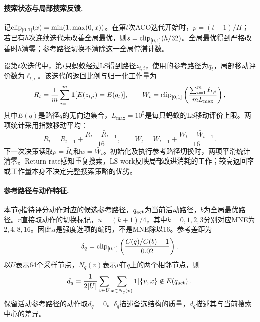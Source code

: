 \paragraph{搜索状态与局部搜索反馈.}
记$\operatorname{clip}_{[0,1]}(x)=\min(1,\max(0,x))$。在第$t$次ACO迭代开始时，$p=(t-1)/H$；若已有$h$次连续迭代未改善全局最优，则$s=\operatorname{clip}_{[0,1]}(h/32)$。全局最优得到严格改善时$h$清零；参考路径切换不清除这一全局停滞计数。

设第$t$次迭代中，第$i$只蚂蚁经过LS得到路径$z_{t,i}$，使用的参考路径为$q_t$，局部移动评价数为$\ell_{t,i}$。该迭代的返回比例与归一化工作量为
\begin{equation}
 R_t=\frac1m\sum_{i=1}^m\mathbf{1}[E(z_{t,i})=E(q_t)],\qquad
 W_t=\operatorname{clip}_{[0,1]}\left(\frac{\sum_{i=1}^m\ell_{t,i}}{mL_{\max}}\right),
\end{equation}
其中$E(q)$是路径$q$的无向边集合，$L_{\max}=10^5$是每只蚂蚁的LS移动评价上限。两项统计采用指数移动平均：
\begin{equation}
 \bar R_t=\bar R_{t-1}+\frac{R_t-\bar R_{t-1}}{16},\qquad
 \bar W_t=\bar W_{t-1}+\frac{W_t-\bar W_{t-1}}{16}.
\end{equation}
下一次决策读取$\rho=\bar R_t$和$w=\bar W_t$。初始化及执行参考路径切换时，两项平滑统计清零。Return rate感知重复搜索，LS work反映局部改进消耗的工作；较高返回率或工作量本身不决定完整搜索策略的优劣。

\paragraph{参考路径与动作特征.}
本节$q$指待评分动作对应的候选参考路径，$q_{\rm act}$为当前活动路径，$b$为全局最优路径。$r$直接取动作的切换标记，$u=(k+1)/4$，其中$k=0,1,2,3$分别对应MNE为$2,4,8,16$。因此$u$是强度选项的编码，不是MNE除以16。参考差距为
\begin{equation}
 \delta_q=\operatorname{clip}_{[0,1]}\left(\frac{C(q)/C(b)-1}{0.02}\right).
\end{equation}
以$U$表示64个采样节点，$N_q(v)$表示$v$在$q$上的两个相邻节点，则
\begin{equation}
 d_q=\frac{1}{2|U|}\sum_{v\in U}\sum_{x\in N_q(v)}
 \mathbf{1}[\{v,x\}\notin E(q_{\rm act})].
\end{equation}
保留活动参考路径的动作取$d_q=0$。$\delta_q$描述备选结构的质量，$d_q$描述其与当前搜索中心的差异。


